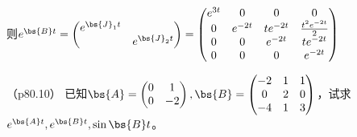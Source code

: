 \documentclass[12pt, a4paper, oneside, UTF8]{ctexbook}
\begin{document}
\begin{solution}
    则$e^{\bs{B}t}=\begin{pmatrix}
        e^{\bs{J}_1 t} & \\
         & e^{\bs{J}_2 t}
    \end{pmatrix}=\begin{pmatrix}
        e^{3t}&0 &0 &0 \\
         0&e^{-2t}&te^{-2t} &\frac{t^2e^{-2t} }{2}\\
         0&0 & e^{-2t} & te^{-2t} \\
         0& 0& 0& e^{-2t} 
    \end{pmatrix}$

\end{solution}


\begin{question}（p80.10）
    已知$\bs{A}=\begin{pmatrix}
        0 & 1\\
        0 & -2
    \end{pmatrix},\bs{B}=\begin{pmatrix}
        -2 & 1 & 1\\
        0& 2 & 0\\
        -4 & 1& 3
    \end{pmatrix}$，试求$e^{\bs{A}t},e^{\bs{B}t},\sin \bs{B}t$。
\end{question}
\end{document}
